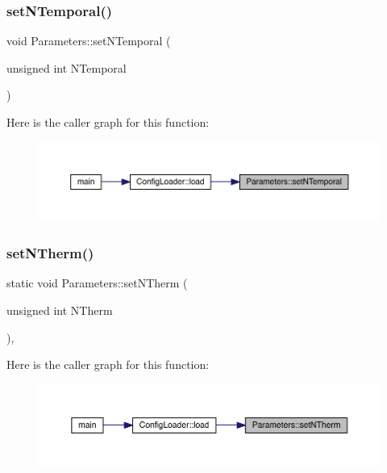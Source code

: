 \subsubsection{\texorpdfstring{setNTemporal()}{setNTemporal()}}
{\footnotesize\ttfamily void Parameters\+::set\+N\+Temporal (\begin{DoxyParamCaption}\item[{unsigned int}]{N\+Temporal }\end{DoxyParamCaption})\hspace{0.3cm}{\ttfamily [static]}}

Here is the caller graph for this function\+:\nopagebreak
\begin{figure}[H]
\begin{center}
\leavevmode
\includegraphics[width=350pt]{class_parameters_a8b9ea6055d41cd08a060bc72332a63af_icgraph}
\end{center}
\end{figure}
\mbox{\label{class_parameters_a97a1e5d00965cf1d552a8c8dbb45cd53}} 
\subsubsection{\texorpdfstring{setNTherm()}{setNTherm()}}
{\footnotesize\ttfamily static void Parameters\+::set\+N\+Therm (\begin{DoxyParamCaption}\item[{unsigned int}]{N\+Therm }\end{DoxyParamCaption})\hspace{0.3cm}{\ttfamily [inline]}, {\ttfamily [static]}}

Here is the caller graph for this function\+:\nopagebreak
\begin{figure}[H]
\begin{center}
\leavevmode
\includegraphics[width=350pt]{class_parameters_a97a1e5d00965cf1d552a8c8dbb45cd53_icgraph}
\end{center}
\end{figure}
\mbox{\label{class_parameters_ae443546fea1f1ceaf3683cb368f7f5bb}} 
